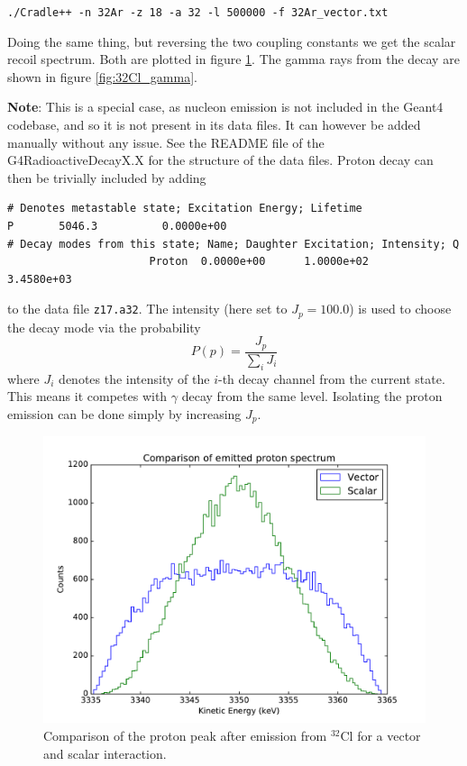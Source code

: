 \documentclass[11pt,a4paper]{article}
\theoremstyle{plain}
\theoremstyle{definition}
\theoremstyle{remark}
\begin{document}
{\tt ./Cradle++ -n 32Ar -z 18 -a 32 -l 500000 -f 32Ar\_vector.txt}
\vspace{10pt}

Doing the same thing, but reversing the two coupling constants we get the scalar recoil spectrum. Both are plotted in figure \ref{fig:32Ar_p}. The gamma rays from the decay are shown in figure \ref{fig:32Cl_gamma}. 
\vspace{10pt}

\textbf{Note}: This is a special case, as nucleon emission is not included in the Geant4 codebase, and so it is not present in its data files. It can however be added manually without any issue. See the README file of the G4RadioactiveDecayX.X for the structure of the data files. Proton decay can then be trivially included by adding

\begin{verbatim}
# Denotes metastable state; Excitation Energy; Lifetime
P       5046.3          0.0000e+00
# Decay modes from this state; Name; Daughter Excitation; Intensity; Q
                      Proton  0.0000e+00      1.0000e+02      3.4580e+03
\end{verbatim}
to the data file {\tt z17.a32}. The intensity (here set to $J_p = 100.0$) is used to choose the decay mode via the probability
\begin{equation}
P(p) = \frac{J_p}{\sum_i J_i}
\end{equation}
where $J_i$ denotes the intensity of the $i$-th decay channel from the current state. This means it competes with $\gamma$ decay from the same level. Isolating the proton emission can be done simply by increasing $J_p$.
\begin{figure}[h!]
\vspace{-20pt}
\centering
\includegraphics[width=\textwidth]{32Ar_proton.pdf}
\caption{Comparison of the proton peak after emission from $^{32}$Cl for a vector and scalar interaction.}
\label{fig:32Ar_p}
\end{figure}
\end{document}
